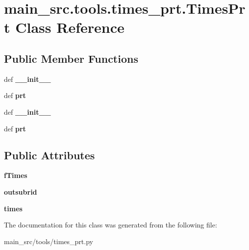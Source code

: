 \hypertarget{classmain__src_1_1tools_1_1times__prt_1_1TimesPrt}{\section{main\-\_\-src.\-tools.\-times\-\_\-prt.\-Times\-Prt Class Reference}
\label{classmain__src_1_1tools_1_1times__prt_1_1TimesPrt}
}
\subsection*{Public Member Functions}
\begin{DoxyCompactItemize}
\item 
\hypertarget{classmain__src_1_1tools_1_1times__prt_1_1TimesPrt_a926587f572de4c91dfdc1a0f75aba688}{def {\bfseries \-\_\-\-\_\-init\-\_\-\-\_\-}}\label{classmain__src_1_1tools_1_1times__prt_1_1TimesPrt_a926587f572de4c91dfdc1a0f75aba688}

\item 
\hypertarget{classmain__src_1_1tools_1_1times__prt_1_1TimesPrt_a24cb968ff563db96eadc267e98dff2db}{def {\bfseries prt}}\label{classmain__src_1_1tools_1_1times__prt_1_1TimesPrt_a24cb968ff563db96eadc267e98dff2db}

\item 
\hypertarget{classmain__src_1_1tools_1_1times__prt_1_1TimesPrt_a926587f572de4c91dfdc1a0f75aba688}{def {\bfseries \-\_\-\-\_\-init\-\_\-\-\_\-}}\label{classmain__src_1_1tools_1_1times__prt_1_1TimesPrt_a926587f572de4c91dfdc1a0f75aba688}

\item 
\hypertarget{classmain__src_1_1tools_1_1times__prt_1_1TimesPrt_a24cb968ff563db96eadc267e98dff2db}{def {\bfseries prt}}\label{classmain__src_1_1tools_1_1times__prt_1_1TimesPrt_a24cb968ff563db96eadc267e98dff2db}

\end{DoxyCompactItemize}
\subsection*{Public Attributes}
\begin{DoxyCompactItemize}
\item 
\hypertarget{classmain__src_1_1tools_1_1times__prt_1_1TimesPrt_a37e95132ca53b47ffe1dd7516a1d3979}{{\bfseries f\-Times}}\label{classmain__src_1_1tools_1_1times__prt_1_1TimesPrt_a37e95132ca53b47ffe1dd7516a1d3979}

\item 
\hypertarget{classmain__src_1_1tools_1_1times__prt_1_1TimesPrt_abf3854d0590c7359785d9051967c84b0}{{\bfseries outsubrid}}\label{classmain__src_1_1tools_1_1times__prt_1_1TimesPrt_abf3854d0590c7359785d9051967c84b0}

\item 
\hypertarget{classmain__src_1_1tools_1_1times__prt_1_1TimesPrt_a2c4f5ea19ef307244144f0e7ac3af943}{{\bfseries times}}\label{classmain__src_1_1tools_1_1times__prt_1_1TimesPrt_a2c4f5ea19ef307244144f0e7ac3af943}

\end{DoxyCompactItemize}


The documentation for this class was generated from the following file\-:\begin{DoxyCompactItemize}
\item 
main\-\_\-src/tools/times\-\_\-prt.\-py\end{DoxyCompactItemize}
